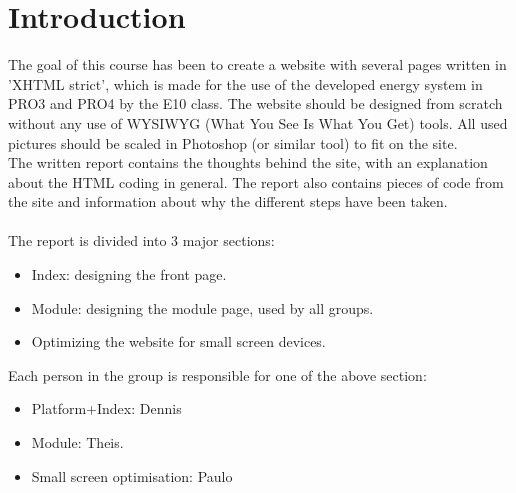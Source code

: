 \chapter{Introduction}
The goal of this course has been to create a website with several pages written in 'XHTML strict', which is made for the use of the developed energy system in PRO3 and PRO4 by the E10 class. The website should be designed from scratch without any use of WYSIWYG (What You See Is What You Get) tools. All used pictures should be scaled in Photoshop (or similar tool) to fit on the site. \\The written report contains the thoughts behind the site, with an explanation about the HTML coding in general. The report also contains pieces of code from the site and information about why the different steps have been taken. \\
\\
The report is divided into 3 major sections:
\begin{itemize}
	\item Index: designing the front page.
	\item Module: designing the module page, used by all groups.
	\item Optimizing the website for small screen devices.
\end{itemize}
Each person in the group is responsible for one of the above section:
\begin{itemize}
	\item Platform+Index: Dennis
	\item Module: Theis.
	\item Small screen optimisation: Paulo
\end{itemize}
